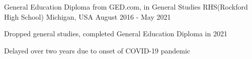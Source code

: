 

\begin{cventries}

   \cventry
   {General Education Diploma from GED.com, in General Studies} %
   {RHS(Rockford High School)} %
   {Michigan, USA} %
   {August 2016 - May 2021} %
   {
      \begin{cvitems} %
         \item {Dropped general studies, completed General Education Diploma in 2021}
         \item {Delayed over two years due to onset of COVID-19 pandemic}
      \end{cvitems}
   }

\end{cventries}